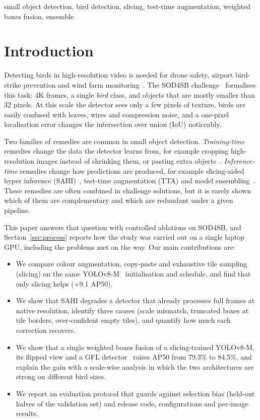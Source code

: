 \documentclass[conference]{IEEEtran}
\begin{document}
\begin{IEEEkeywords}
small object detection, bird detection, slicing, test-time augmentation, weighted boxes fusion, ensemble
\end{IEEEkeywords}

\section{Introduction}
Detecting birds in high-resolution video is needed for drone safety, airport bird-strike prevention and wind
farm monitoring~\cite{fujii2021distant,sun2022airbirds,yoshihashi2017windfarm}. The SOD4SB
challenge~\cite{kondo2023sod4sb} formalises this task: 4K frames, a single \emph{bird} class, and objects that
are mostly smaller than 32 pixels. At this scale the detector sees only a few pixels of texture, birds are
easily confused with leaves, wires and compression noise, and a one-pixel localisation error changes the
intersection over union (IoU) noticeably.

Two families of remedies are common in small object detection. \emph{Training-time} remedies change the data the
detector learns from, for example cropping high-resolution images instead of shrinking them, or pasting extra
objects~\cite{ghiasi2021copypaste}. \emph{Inference-time} remedies change how predictions are produced, for example
slicing-aided hyper inference (SAHI)~\cite{akyon2022sahi}, test-time augmentation (TTA) and model
ensembling~\cite{solovyev2021wbf,hou2023ensemble}. These remedies are often combined in challenge solutions,
but it is rarely shown which of them are complementary and which are redundant under a given pipeline.

This paper answers that question with controlled ablations on SOD4SB, and Section~\ref{sec:process} reports how
the study was carried out on a single laptop GPU, including the problems met on the way. Our main contributions are:
\begin{itemize}
\item We compare colour augmentation, copy-paste and exhaustive tile sampling (slicing) on the same
YOLOv8-M~\cite{jocher2023yolov8} initialisation and schedule, and find that only slicing helps (+9.1 AP50).
\item We show that SAHI degrades a detector that already processes full frames at native resolution, identify
three causes (scale mismatch, truncated boxes at tile borders, over-confident empty tiles), and quantify how much
each correction recovers.
\item We show that a single weighted boxes fusion of a slicing-trained YOLOv8-M, its flipped view and a GFL
detector~\cite{li2020gfl} raises AP50 from 79.3\% to 84.5\%, and explain the gain with a scale-wise analysis in
which the two architectures are strong on different bird sizes.
\item We report an evaluation protocol that guards against selection bias (held-out halves of the validation
set) and release code, configurations and per-image results.
\end{itemize}
\end{document}
